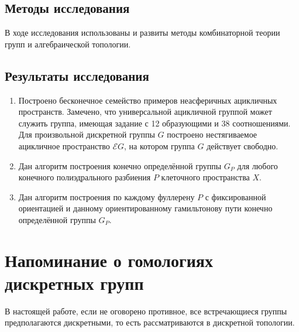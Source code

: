 \documentclass[14pt, dvipsnames, twoside]{extarticle}
\theoremstyle{definition}
\theoremstyle{remark}
\begin{document}
\subsection{Методы исследования}

В ходе исследования использованы и развиты методы комбинаторной теории групп и алгебраической топологии.












\subsection{Результаты исследования}


\begin{enumerate}[\bf 1.]

\item Построено бесконечное семейство примеров неасферичных ацикличных пространств. Замечено, что универсальной ацикличной группой может служить группа, имеющая задание с 12 образующими и 38 соотношениями.  Для произвольной дискретной группы $G$ построено нестягиваемое ацикличное пространство $\mathcal{E}G$, на котором группа $G$ действует свободно.

\item Дан алгоритм построения конечно определённой группы $G_P$ для любого конечного полиэдрального разбиения $P$ клеточного пространства $X$.

\item Дан алгоритм построения по каждому фуллерену $P$ с фиксированной ориентацией и данному ориентированному гамильтонову пути конечно определённой группы $G_P$. 

\end{enumerate}
















\section{Напоминание о гомологиях дискретных групп}

В настоящей работе, если не оговорено противное, все встречающиеся группы предполагаются дискретными, то есть рассматриваются в дискретной топологии.
\end{document}

